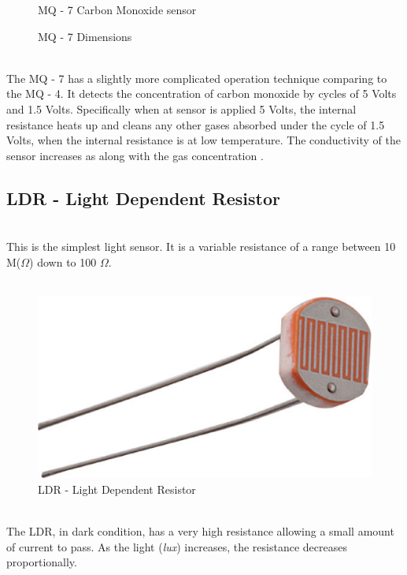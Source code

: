 \documentclass[12pt,a4paper]{report}
\begin{document}
\begin{figure}[H]
\caption{MQ - 7 Carbon Monoxide  sensor}
\caption{MQ - 7 Dimensions}
\end{figure}
\ \\
The MQ - 7 has a slightly more complicated operation technique comparing to the MQ - 4. It detects the concentration of carbon monoxide by cycles of 5 Volts and 1.5 Volts. Specifically when at sensor is applied 5 Volts, the internal resistance heats up and cleans any other gases absorbed under the cycle of 1.5 Volts, when the internal resistance is at low temperature. 
The conductivity of the sensor increases as along with the gas concentration \cite{website:mq7_datasheet}.
\ \\
%
\subsection{LDR - Light Dependent Resistor}
\ \\
This is the simplest light sensor. It is a variable resistance of a range between 10 M($\Omega$) down to 100 $\Omega$.
\\ \
\begin{figure}[H]
\centering
\includegraphics*[scale=0.2]{ldr}
\caption{LDR - Light Dependent Resistor}
\end{figure}
\ \\
The LDR, in dark condition, has a very high resistance allowing a small amount of current to pass. As the light (\textit{lux}) increases, the resistance decreases proportionally.
\ \\
%
\end{document}
